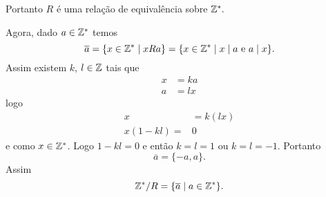 \documentclass[12pt]{article}
\begin{document}
	Portanto $R$ é uma relação de equivalência sobre $\mathbb{Z}^*.$

	Agora, dado $a \in \mathbb{Z}^*$ temos
	\[
		\overline{a} = \{x \in \mathbb{Z}^* \mid xRa\} = \{ x \in \mathbb{Z}^* \mid x \mid a \mbox{ e } a \mid x\}.
	\]
	Assim existem $k$, $l \in \mathbb{Z}$ tais que
	\begin{align*}
		x &= ka\\
		a &= lx
	\end{align*}
	logo
	\begin{align*}
		x &= k(lx)\\
		x(1 - kl) =& 0
	\end{align*}
	e como $x \in \mathbb{Z}^*$. Logo $1 - kl = 0$ e então $k = l = 1$ ou $k = l = -1$. Portanto
	\[
		\overline{a} = \{-a,a\}.
	\]
	Assim
	\[
		\mathbb{Z}^*/R = \{\overline{a} \mid a \in \mathbb{Z}^*\}.
	\]
\end{document}

